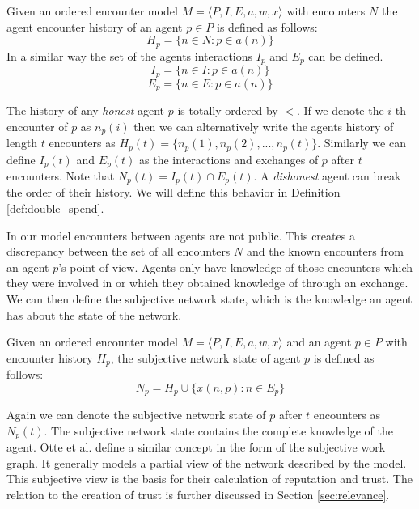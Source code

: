 \begin{defn}
    Given an ordered encounter model $M = \langle P, I, E, a, w, x \rangle$ with encounters $N$ the 
    agent encounter history of an agent $p \in P$ is defined as follows:
    \begin{equation}
        H_p = \{ n \in N : p \in a(n) \}
    \end{equation}
    In a similar way the set of the agents interactions $I_p$ and $E_p$ can be defined.
    \begin{equation}
        I_p = \{ n \in I : p \in a(n) \}
    \end{equation}
    \begin{equation}
        E_p = \{ n \in E : p \in a(n) \}
    \end{equation}
\end{defn}

The history of any \textit{honest} agent $p$ is totally ordered by $<$. If we denote the 
$i$-th encounter of $p$ as $n_p(i)$ then we can alternatively write the agents history of length $t$ 
encounters as $H_p(t) = \{ n_p(1), n_p(2), ..., n_p(t)\}$. Similarly we can define $I_p(t)$ and 
$E_p(t)$ as the interactions and exchanges of $p$ after $t$ encounters. Note that $N_p(t) = I_p(t) \cap E_p(t)$. 
A \textit{dishonest} agent can break the order of their history. We will define this behavior in 
Definition \ref{def:double_spend}.

In our model encounters between agents are not public. This creates a discrepancy between the set of all
encounters $N$ and the known encounters from an agent $p$'s point of view. Agents only have 
knowledge of those encounters which they were involved in or which they obtained knowledge of through an exchange.
We can then define the subjective network state, which is the knowledge an agent has about the state of
the network.

\begin{defn}
    \label{def:subjective_network_state}
    Given an ordered encounter model $M = \langle P, I, E, a, w, x \rangle$  and an agent $p \in P$ 
    with encounter history $H_p$, the subjective network state of agent $p$
    is defined as follows:
    \begin{equation}
        N_p = H_p \cup \{ x(n, p) : n \in E_p \}
    \end{equation}
\end{defn}

Again we can denote the subjective network state of $p$ after $t$ encounters as $N_p(t)$.
The subjective network state contains the complete knowledge of the agent. Otte et al. define a
similar concept in the form of the subjective work graph. It generally models a partial view
of the network described by the model. This subjective view is the basis for their calculation of 
reputation and trust. The relation to the creation of trust is further discussed in Section \ref{sec:relevance}.

